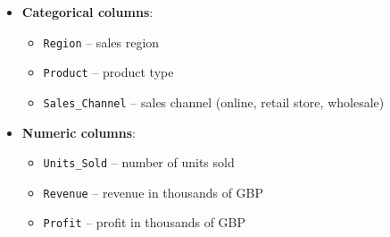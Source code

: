 \documentclass[
  english,
  letterpaper,
  DIV=11,
  numbers=noendperiod]{scrreprt}
\providecommand{\tightlist}{%
  \setlength{\itemsep}{0pt}\setlength{\parskip}{0pt}}
\begin{document}
\begin{itemize}
\tightlist
\item
  \textbf{Categorical columns}:

  \begin{itemize}
  \tightlist
  \item
    \texttt{Region} -- sales region
  \item
    \texttt{Product} -- product type
  \item
    \texttt{Sales\_Channel} -- sales channel (online, retail store,
    wholesale)
  \end{itemize}
\item
  \textbf{Numeric columns}:

  \begin{itemize}
  \tightlist
  \item
    \texttt{Units\_Sold} -- number of units sold
  \item
    \texttt{Revenue} -- revenue in thousands of GBP
  \item
    \texttt{Profit} -- profit in thousands of GBP
  \end{itemize}
\end{itemize}
\end{document}
